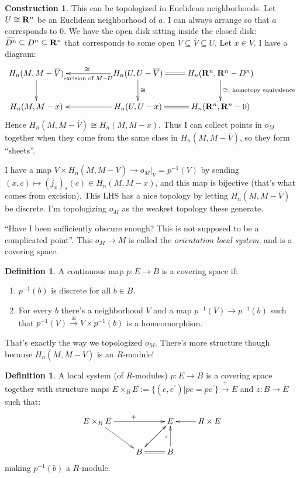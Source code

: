 \documentclass{amsart}
\theoremstyle{theorem}
\theoremstyle{definition}
\newtheorem{definition}[theorem]{Definition}
\newtheorem{construction}[theorem]{Construction}
\begin{document}
\begin{construction}
This can be topologized in Euclidean neighborhoods. Let $U\cong\mathbf R^n$ be an Euclidean neighborhood of $a$. I can always arrange so that $a$ corresponds to $0$. We have the open disk sitting inside the closed disk: $\widetilde{D^n}\subseteq D^n\subseteq \mathbf R^n$ that corresponds to some open $V\subseteq \overline{V}\subseteq U$. Let $x\in V$. I have a diagram:
\begin{equation*}
\xymatrix{
	H_n(M,M-\overline{V})\ar[d] & & H_n(U,U-\overline{V})\ar[ll]^{\text{ excision of }M-U}_{\cong}\ar[d]^\cong & H_n(\RR^n,\RR^n-D^n)\ar@{=}[l]\ar[d]^{\cong,\text{ homotopy equivalence}}\\
	H_n(M,M-x) & & H_n(U,U-x)\ar[ll] & H_n(\RR^n,\RR^n-0)\ar@{=}[l]
}
\end{equation*}
Hence $H_n(M,M-\overline{V})\cong H_n(M,M-x)$. Thus I can collect points in $o_M$ together when they come from the same class in $H_n(M,M-\overline{V})$, so they form ``sheets''.

I have a map $V\times H_n(M,M-\overline{V})\to o_M|_{V}=p^{-1}(V)$ by sending $(x,c)\mapsto (j_x)_\ast(c)\in H_n(M,M-x)$, and this map is bijective (that's what comes from excision). This LHS has a nice topology by letting $H_n(M,M-\overline{V})$ be discrete. I'm topologizing $o_M$ as the weakest topology these generate.
\end{construction}
``Have I been sufficiently obscure enough? This is not supposed to be a complicated point''. This $o_M\to M$ is called the \emph{orientation local system}, and is a covering space.
\begin{definition}
A continuous map $p:E\to B$ is a covering space if:
\begin{enumerate}
\item $p^{-1}(b)$ is discrete for all $b\in B$.
\item For every $b$ there's a neighborhood $V$ and a map $p^{-1}(V)\to p^{-1}(b)$ such that $p^{-1}(V)\xrightarrow{\cong}V\times p^{-1}(b)$ is a homeomorphism.
\end{enumerate}
\end{definition}
That's exactly the way we topologized $o_M$. There's more structure though because $H_n(M,M-\overline{V})$ is an $R$-module!
\begin{definition}
A local system (of $R$-modules) $p:E\to B$ is a covering space together with structure maps $E\times_B E:=\{(e,e^\prime)|pe=pe^\prime\}\xrightarrow{+} E$ and $z:B\to E$ such that:
\begin{equation*}
\xymatrix{
	E\times_B E\ar[rr]^+\ar[dr] & & E\ar[dl] & R\times E\ar[l]\\
	 & B\ar@{=}[r]\ar[ur] & B\ar[u]^{z} & 
}
\end{equation*}
making $p^{-1}(b)$ a $R$-module.
\end{definition}
\end{document}
